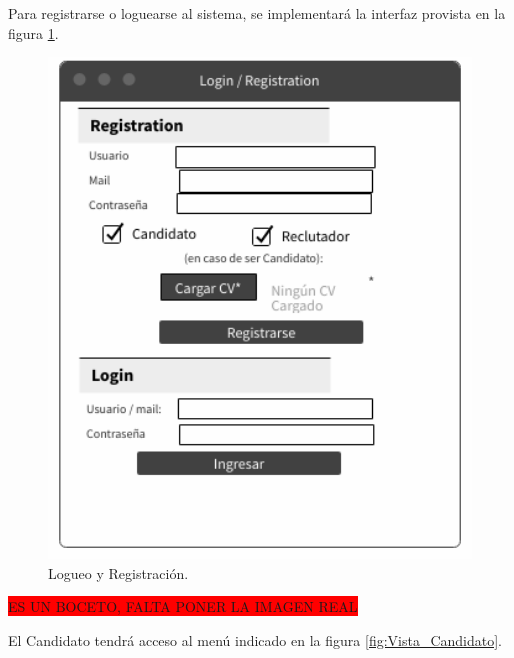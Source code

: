 \documentclass[12pt,a4paper]{article}
\begin{document}
\begin{sloppypar}
Para registrarse o loguearse al sistema, se implementará la interfaz provista en la figura \ref{fig:Vista_Registro}.

\begin{figure}[H]    %
  \centering
  \includegraphics[width=1\textwidth]{images/Vista_Registro.png}
  \caption{Logueo y Registración.}  
  \label{fig:Vista_Registro}
\end{figure}

\colorbox{red}{ES UN BOCETO, FALTA PONER LA IMAGEN REAL}

El Candidato tendrá acceso al menú indicado en la figura \ref{fig:Vista_Candidato}. 


\end{sloppypar}
\end{document}
